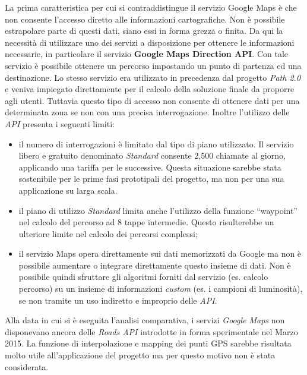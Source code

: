 La prima caratteristica per cui si contraddistingue il servizio Google Maps è che non consente l'accesso diretto alle informazioni cartografiche. Non è possibile estrapolare parte di questi dati, siano essi in forma grezza o finita. Da qui la necessità di utilizzare uno dei servizi a disposizione per ottenere le informazioni necessarie, in particolare il servizio \textbf{Google Maps Direction API}. Con tale servizio è possibile ottenere un percorso impostando un punto di partenza ed una destinazione. Lo stesso servizio era utilizzato in precedenza dal progetto \emph{Path 2.0} e veniva impiegato direttamente per il calcolo della soluzione finale da proporre agli utenti. Tuttavia questo tipo di accesso non consente di ottenere dati per una determinata zona se non con una precisa interrogazione. Inoltre l'utilizzo delle \emph{API} presenta i seguenti limiti:
\begin{itemize}
  \item il numero di interrogazioni è limitato dal tipo di piano utilizzato. Il servizio libero e gratuito denominato \emph{Standard} consente 2,500 chiamate al giorno, applicando una tariffa per le successive. Questa situazione sarebbe stata sostenibile per le prime fasi prototipali del progetto, ma non per una sua applicazione su larga scala.
  \item il piano di utilizzo \emph{Standard} limita anche l'utilizzo della funzione ``waypoint'' nel calcolo del percorso ad 8 tappe intermedie. Questo risulterebbe un ulteriore limite nel calcolo dei percorsi complessi;
  \item il servizio Maps opera direttamente sui dati memorizzati da Google ma non è possibile aumentare o integrare direttamente questo insieme di dati. Non è possibile quindi sfruttare gli algoritmi forniti dal servizio (es. calcolo percorso) su un insieme di informazioni \emph{custom} (es. i campioni di luminosità), se non tramite un uso indiretto e improprio delle \emph{API}.
\end{itemize}
Alla data in cui si è eseguita l'analisi comparativa, i servizi \emph{Google Maps} non disponevano ancora delle \emph{Roads API} introdotte in forma sperimentale nel Marzo 2015. La funzione di interpolazione e mapping dei punti GPS sarebbe risultata molto utile all'applicazione del progetto ma per questo motivo non è stata considerata.

